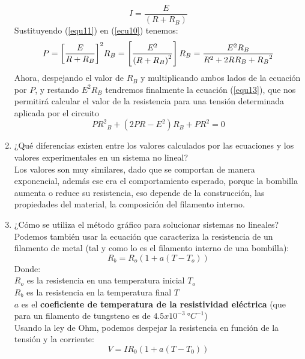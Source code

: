 \documentclass[twocolumn]{IEEEtran}
\begin{document}
\begin{enumerate}
\begin{equation}
 I = \frac{E}{(R + R_B)}
\label{equ11}
\end{equation}
\noindent
Sustituyendo (\ref{equ11}) en (\ref{ecu10}) tenemos:
\begin{equation}
\footnotesize{
 P = {\left[ {\frac{E}{{R + {R_B}}}} \right]^2}{R_B} = \left[ {\frac{{{E^2}}}{{{{\left( {R + {R_B}} \right)}^2}}}} \right]{R_B} = \frac{{{E^2}{R_B}}}{{{R^2} + 2R{R_B} + {R_B}^2}}}
\label{equ12}
\end{equation}
\noindent
Ahora, despejando el valor de $R_B$ y multiplicando ambos lados de la ecuación por $P$, y restando $E^2R_B$ tendremos finalmente la ecuación (\ref{equ13}), que nos permitirá calcular el valor de la resistencia para una tensión determinada aplicada por el circuito
\begin{equation}
 P{R^2}_B + \left( {2PR - {E^2}} \right){R_B} + P{R^2} = 0
\label{equ13}
\end{equation}
 \item ¿Qué diferencias existen entre los valores calculados por las ecuaciones y los valores experimentales en un sistema no lineal?\\
Los valores son muy similares, dado que se comportan de manera exponencial, además ese era el comportamiento esperado, porque la bombilla aumenta o reduce su resistencia, eso depende de la construcción, las propiedades del material, la composición del filamento interno.
 \item ¿Cómo se utiliza el método gráfico para solucionar sistemas no lineales?\\
Podemos también usar la ecuación que caracteriza la resistencia de un filamento de metal (tal y como lo es el filamento interno de una bombilla):
\begin{equation}
 R_b = R_o(1+a(T-T_o))
\label{equ10}
\end{equation}
\noindent
Donde:\\
$R_o$ es la resistencia en una temperatura inicial $T_o$\\
$R_b$ es la resistencia en la  temperatura final $T$\\
$a$ es el \textbf{coeficiente de temperatura de la resistividad eléctrica} (que para un filamento de tungsteno es de $4.5 x 10^{-3} \ °C^{-1}$)\\
Usando la ley de Ohm, podemos despejar la resistencia en función de la tensión  y la corriente:
\begin{equation}
 V = I{R_0}\left( {1 + a\left( {T - {T_0}} \right)} \right)
\label{equ14}

\end{equation}
\end{enumerate}
\end{document}
